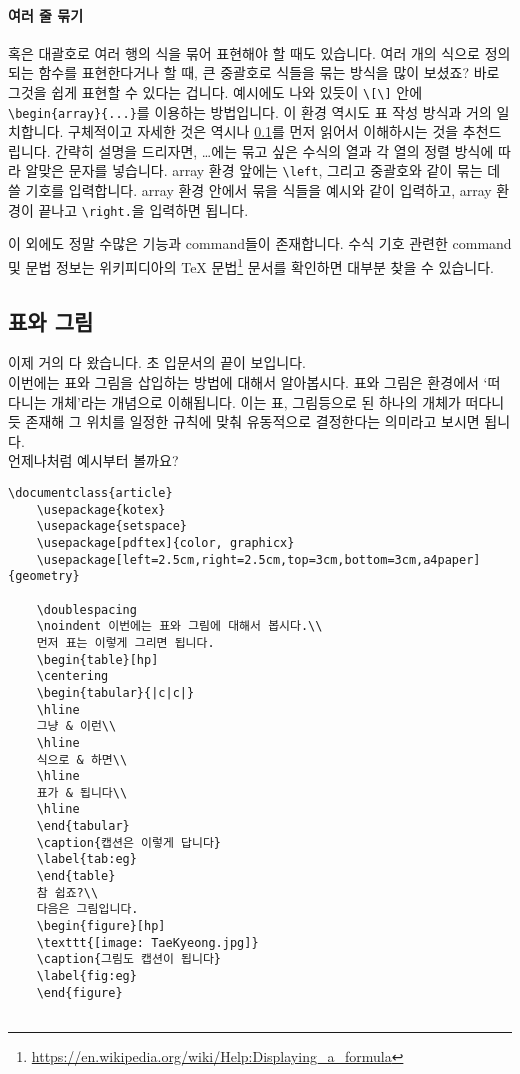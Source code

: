 \paragraph{여러 줄 묶기}
혹은 대괄호로 여러 행의 식을 묶어 표현해야 할 때도 있습니다.
여러 개의 식으로 정의되는 함수를 표현한다거나 할 때, 큰 중괄호로 식들을 묶는 방식을 많이 보셨죠?
바로 그것을 쉽게 표현할 수 있다는 겁니다.
예시에도 나와 있듯이 \verb|\[\]| 안에 \verb|\begin{array}{...}|를 이용하는 방법입니다.
이 환경 역시도 표 작성 방식과 거의 일치합니다.
구체적이고 자세한 것은 역시나 \ref{subsec:tabfig}를 먼저 읽어서 이해하시는 것을 추천드립니다.
간략히 설명을 드리자면, \dots 에는 묶고 싶은 수식의 열과 각 열의 정렬 방식에 따라 알맞은 문자를 넣습니다.
array 환경 앞에는 \verb|\left|, 그리고 중괄호와 같이 묶는 데 쓸 기호를 입력합니다.
array 환경 안에서 묶을 식들을 예시와 같이 입력하고, array 환경이 끝나고 \verb|\right.|을 입력하면 됩니다.

이 외에도 정말 수많은 기능과 command들이 존재합니다.
수식 기호 관련한 command 및 문법 정보는 위키피디아의 TeX 문법\footnote{\url{https://en.wikipedia.org/wiki/Help:Displaying_a_formula}} 문서를 확인하면 대부분 찾을 수 있습니다.

\subsection{표와 그림}
\label{subsec:tabfig}
이제 거의 다 왔습니다. 초 입문서의 끝이 보입니다.\\
이번에는 표와 그림을 삽입하는 방법에 대해서 알아봅시다.
표와 그림은 \lt 환경에서 `떠다니는 개체'라는 개념으로 이해됩니다.
이는 표, 그림등으로 된 하나의 개체가 떠다니듯 존재해 그 위치를 일정한 규칙에 맞춰 유동적으로 결정한다는 의미라고 보시면 됩니다.\\
언제나처럼 예시부터 볼까요?

\begin{Verbatim}[frame=single]
	\documentclass{article}
	\usepackage{kotex}
	\usepackage{setspace}
	\usepackage[pdftex]{color, graphicx}
	\usepackage[left=2.5cm,right=2.5cm,top=3cm,bottom=3cm,a4paper]{geometry}
	
	\doublespacing
	\noindent 이번에는 표와 그림에 대해서 봅시다.\\
	먼저 표는 이렇게 그리면 됩니다.
	\begin{table}[hp]
	\centering
	\begin{tabular}{|c|c|}
	\hline
	그냥 & 이런\\
	\hline
	식으로 & 하면\\
	\hline
	표가 & 됩니다\\
	\hline
	\end{tabular}
	\caption{캡션은 이렇게 답니다}
	\label{tab:eg}
	\end{table}
	참 쉽죠?\\
	다음은 그림입니다.
	\begin{figure}[hp]
	\texttt{[image: TaeKyeong.jpg]}
	\caption{그림도 캡션이 됩니다}
	\label{fig:eg}
	\end{figure}
	
\end{Verbatim}

